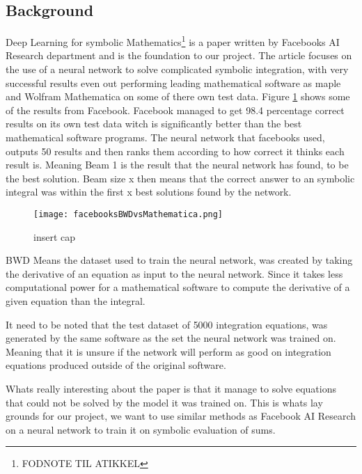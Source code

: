


\subsection{Background}
Deep Learning for symbolic Mathematics\footnote{FODNOTE TIL ATIKKEL} is a paper written by Facebooks AI Research department and is the foundation to our project. The article focuses on the use of a neural network to solve complicated symbolic integration, with very successful results even out performing leading mathematical software as maple and Wolfram Mathematica on some of there own test data. Figure \ref{facebooks_res1} shows some of the results from Facebook. Facebook managed to get 98.4 percentage correct results on its own test data witch is significantly better than the best mathematical software programs. The neural network that facebooks used, outputs 50 results and then ranks them according to how correct it thinks each result is. Meaning Beam 1 is the result that the neural network has found, to be the best solution. Beam size x then means that the correct answer to an symbolic integral was within the first x best solutions found by the network.  

\begin{figure}[H]    
    \centering
    \label{facebooks_res1}
    \texttt{[image: facebooksBWDvsMathematica.png]}
    \caption{insert cap}
\end{figure}



BWD Means the dataset used to train the neural network, was created by taking the derivative of an equation as input to the neural network. Since it takes less computational power for a mathematical software to compute the derivative of a given equation than the integral. 

It need to be noted that the test dataset of 5000 integration equations, was generated by the same software as the set the neural network was trained on. Meaning that it is unsure if the network will perform as good on integration equations produced outside of the original software. 

Whats really interesting about the paper is that it manage to solve equations that could not be solved by the model it was trained on. This is whats lay grounds for our project, we want to use similar methods as Facebook AI Research on a neural network to train it on symbolic evaluation of sums.  

